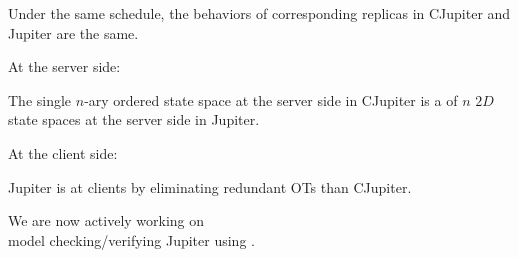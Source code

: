 \begin{frame}{}
  \begin{Theorem}
    Under the same schedule, the behaviors of corresponding replicas in CJupiter and Jupiter are the same.
  \end{Theorem}

  \vspace{0.30cm}
  \centerline{\large At the server side:}
  \begin{prop}
    The single $n$-ary ordered state space at the server side in CJupiter 
    is a  of $n$ $2D$ state spaces at the server side in Jupiter.
  \end{prop}

  \vspace{0.30cm}
  \centerline{\large At the client side:}
  \begin{prop}
    Jupiter is  at clients by eliminating redundant OTs than CJupiter.
  \end{prop}
\end{frame}

\begin{frame}{}
  \begin{center}
    {\Large 
      We are now actively working on \\[8pt]
      model checking/verifying Jupiter using . \\[4pt]
    }
  \end{center}

\end{frame}
